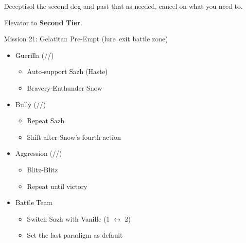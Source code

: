\documentclass{report}
\begin{document}
Deceptisol the second dog and past that as needed, cancel on what you need to.

Elevator to \textbf{Second Tier}.
\renewcommand{\first}{[1] Guerilla (\syn/\sab/\rav)}
\renewcommand{\second}{[2] Tireless Charge (\com/\med/\com)}
\renewcommand{\third}{[3] Hero's Charge (\syn/\med/\com)}
\renewcommand{\fourth}{[4] Devastation (\com/\sab/\com)}
\renewcommand{\fifth}{[5] Bully (\syn/\sab/\com)}
\renewcommand{\sixth}{[6] Aggression (\com/\rav/\com)}
\begin{battle}{Mission 21: Gelatitan Pre-Empt (lure\, exit battle zone)}
\begin{itemize}
    \item \first
    \begin{itemize}
        \item Auto-support Sazh (Haste)
        \item Bravery-Enthunder Snow
    \end{itemize}
    \item \fifth
    \begin{itemize}
        \item Repeat Sazh
        \item Shift after Snow's fourth action
    \end{itemize}
    \item \sixth
    \begin{itemize}
        \item Blitz-Blitz
        \item Repeat until victory
    \end{itemize}
\end{itemize}
\end{battle}
\begin{menu}
\begin{itemize}
    \paradigm
    \begin{itemize}
        \item Battle Team
        \begin{itemize}
            \item Switch Sazh with Vanille (1 $\leftrightarrow$ 2)
            \item Set the last paradigm as default
        \end{itemize}
    \end{itemize}
\end{itemize}
\end{menu}
\end{document}
